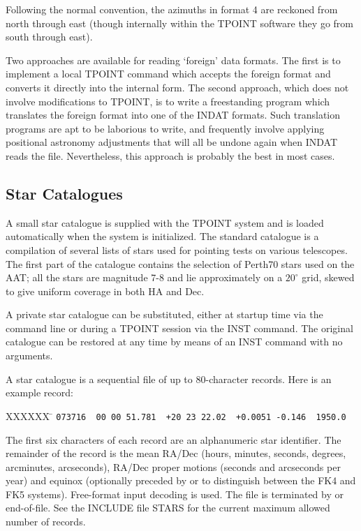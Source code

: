 Following the normal convention, the azimuths in format 4
are reckoned from north through east (though internally
within the TPOINT software they go from south through east).

Two approaches are available for reading `foreign' data formats.
The first is to implement a local TPOINT command which accepts the
foreign format and converts it directly into the internal form.
The second approach, which does not involve
modifications to TPOINT, is to write
a freestanding program which translates the foreign format into
one of the INDAT formats.  Such translation
programs are apt to be laborious
to write, and frequently involve applying positional astronomy
adjustments that will all be undone again when INDAT reads the
file.  Nevertheless, this approach is probably the
best in most cases.

\subsection{Star Catalogues}
A small star catalogue is supplied with the TPOINT system
and is loaded automatically when the system is initialized.  The
standard catalogue is a compilation of several
lists of stars used for pointing tests on various telescopes.
The first part
of the catalogue contains the selection of Perth70 stars used
on the AAT;  all the stars are magnitude 7-8 and lie
approximately on a $20^\circ$ grid, skewed
to give uniform coverage in both HA and Dec.

A private star catalogue can be substituted, either at startup time
via the command line or during a TPOINT session
via the INST command.  The original catalogue can be restored at
any time by means of an INST command with no arguments.

A star catalogue is a sequential file of up to 80-character
records.
Here is an example record:
\begin{tabs}
XXXXXX \= \kill
\> \verb|073716  00 00 51.781  +20 23 22.02  +0.0051 -0.146  1950.0|
\end{tabs}

The first six characters of each record are an
alphanumeric star identifier.  The remainder of the record
is the mean RA/Dec (hours, minutes, seconds, degrees,
arcminutes, arcseconds), RA/Dec proper motions (seconds and
arcseconds per year) and equinox (optionally preceded by
 or  to distinguish between the FK4 and FK5 systems).
Free-format input decoding is used.
The file is terminated by  or end-of-file.  See the
INCLUDE file STARS for the current maximum
allowed number of records.

